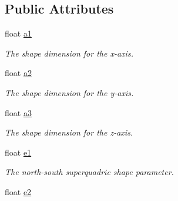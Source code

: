 \subsection*{Public Attributes}
\begin{DoxyCompactItemize}
\item 
\hypertarget{classope_1_1_s_q_parameters_ad53e066db7b58c28ddc1cd1dba13816a}{float \hyperlink{classope_1_1_s_q_parameters_ad53e066db7b58c28ddc1cd1dba13816a}{a1}}\label{classope_1_1_s_q_parameters_ad53e066db7b58c28ddc1cd1dba13816a}

\begin{DoxyCompactList}\small\item\em The shape dimension for the x-\/axis. \end{DoxyCompactList}\item 
\hypertarget{classope_1_1_s_q_parameters_aadbf9e886d61735f73a66bc6181351d6}{float \hyperlink{classope_1_1_s_q_parameters_aadbf9e886d61735f73a66bc6181351d6}{a2}}\label{classope_1_1_s_q_parameters_aadbf9e886d61735f73a66bc6181351d6}

\begin{DoxyCompactList}\small\item\em The shape dimension for the y-\/axis. \end{DoxyCompactList}\item 
\hypertarget{classope_1_1_s_q_parameters_a6246bee7cf392f6770dcaf76492ba48b}{float \hyperlink{classope_1_1_s_q_parameters_a6246bee7cf392f6770dcaf76492ba48b}{a3}}\label{classope_1_1_s_q_parameters_a6246bee7cf392f6770dcaf76492ba48b}

\begin{DoxyCompactList}\small\item\em The shape dimension for the z-\/axis. \end{DoxyCompactList}\item 
\hypertarget{classope_1_1_s_q_parameters_acaa32ea111328b2c67c0bdc7fd408f29}{float \hyperlink{classope_1_1_s_q_parameters_acaa32ea111328b2c67c0bdc7fd408f29}{e1}}\label{classope_1_1_s_q_parameters_acaa32ea111328b2c67c0bdc7fd408f29}

\begin{DoxyCompactList}\small\item\em The north-\/south superquadric shape parameter. \end{DoxyCompactList}\item 
\hypertarget{classope_1_1_s_q_parameters_a126b8eb8be8febbdd1f264d886cc4bb5}{float \hyperlink{classope_1_1_s_q_parameters_a126b8eb8be8febbdd1f264d886cc4bb5}{e2}}\label{classope_1_1_s_q_parameters_a126b8eb8be8febbdd1f264d886cc4bb5}


\end{DoxyCompactItemize}
